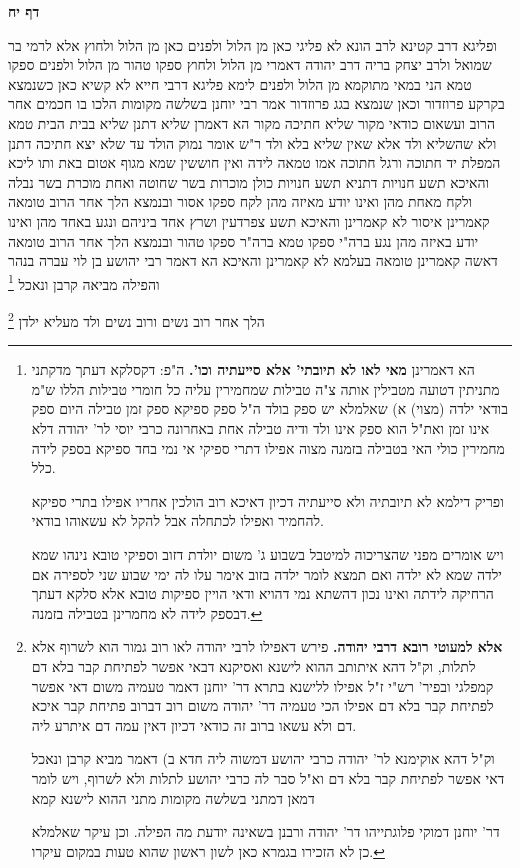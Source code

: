 \documentclass[12pt, openany]{book}
\newcommand{\sethebfont}{
\fontsize{10.5pt}{21.0pt} \selectfont
}
\newcommand{\twocol}[1]{
	{\sethebfont \begin{multicols}{2}
			#1
	\end{multicols}}	
}
\newcommand{\sectname}{}
\newcommand{\newsection}[1]{
	\addcontentsline{toc}{section}{#1}
	\renewcommand{\sectname}{#1}	
	\vspace{-\baselineskip}
	\begin{center}
		\textbf{%
\fontsize{16pt}{16pt}\selectfont
			#1}
	\end{center}
	\vspace{-\baselineskip}
	\nopagebreak
}
\newcommand{\footnotecomment}[1]{\footnote{#1}}
\newcommand{\commenta}[1]{\footnotecomment{#1}}
\begin{document}
\newsection{דף יח}
\twocol{ופליגא דרב קטינא 
לרב הונא לא פליגי כאן מן הלול ולפנים כאן מן הלול ולחוץ 
אלא לרמי בר שמואל ולרב יצחק בריה דרב יהודה דאמרי מן הלול ולחוץ ספקו טהור מן הלול ולפנים ספקו טמא הני במאי מתוקמא מן הלול ולפנים
לימא פליגא דרבי חייא 
לא קשיא כאן כשנמצא בקרקע פרוזדור וכאן שנמצא בגג פרוזדור 
אמר רבי יוחנן  בשלשה מקומות הלכו בו חכמים אחר הרוב ועשאום כודאי  מקור שליא חתיכה  מקור הא דאמרן
שליא דתנן  שליא בבית הבית טמא ולא שהשליא ולד אלא שאין שליא בלא ולד  ר"ש אומר  נמוק הולד עד שלא יצא 
חתיכה דתנן  המפלת יד חתוכה ורגל חתוכה אמו טמאה לידה ואין חוששין שמא מגוף אטום באת 
ותו ליכא  והאיכא תשע חנויות 
דתניא  תשע חנויות כולן מוכרות בשר שחוטה ואחת מוכרת בשר נבלה ולקח מאחת מהן ואינו יודע מאיזה מהן לקח ספקו אסור
ובנמצא הלך אחר הרוב 
טומאה קאמרינן איסור לא קאמרינן 
והאיכא תשע צפרדעין ושרץ אחד ביניהם ונגע באחד מהן ואינו יודע באיזה מהן נגע ברה"י ספקו טמא ברה"ר ספקו טהור
ובנמצא הלך אחר הרוב 
טומאה דאשה קאמרינן טומאה בעלמא לא קאמרינן 
והאיכא הא דאמר רבי יהושע בן לוי  עברה בנהר
והפילה מביאה קרבן ונאכל
\commenta{הא דאמרינן \textbf{מאי לאו לא תיובתי' אלא סייעתיה וכו'.}  ה"פ: דקסלקא דעתך מדקתני מתניתין דטועה מטבילין אותה צ"ה טבילות שמחמירין עליה כל חומרי טבילות הללו ש"מ בודאי ילדה (מצוי) א) שאלמלא יש ספק בולד ה"ל ספק ספיקא ספק זמן טבילה היום ספק אינו זמן ואת"ל הוא ספק אינו ולד ודיה טבילה אחת באחרונה כרבי יוסי לר' יהודה דלא מחמירין כולי האי בטבילה בזמנה מצוה אפילו דתרי ספיקי אי נמי בחד ספיקא בספק לידה כלל.\par ופריק דילמא לא תיובתיה ולא סייעתיה דכיון דאיכא רוב הולכין אחריו אפילו בתרי ספיקא להחמיר ואפילו לכתחלה אבל להקל לא עשאוהו בודאי.\par ויש אומרים מפני שהצריכוה למיטבל בשבוע ג' משום יולדת דזוב וספיקי טובא נינהו שמא ילדה שמא לא ילדה ואם תמצא לומר ילדה בזוב אימר עלו לה ימי שבוע שני לספירה אם הרחיקה לידתה ואינו נכון דהשתא נמי דהויא ודאי הויין ספיקות טובא אלא סלקא דעתך דבספק לידה לא מחמרינן בטבילה בזמנה. }

הלך אחר רוב נשים ורוב נשים ולד מעליא ילדן 
\commenta{\textbf{אלא למעוטי רובא דרבי יהודה.}  פירש דאפילו לרבי יהודה לאו רוב גמור הוא לשרוף אלא לתלות, וק"ל דהא איתותב ההוא לישנא ואסיקנא דבאי אפשר לפתיחת קבר בלא דם קמפלגי ובפיר' רש"י ז"ל אפילו ללישנא בתרא דר' יוחנן דאמר טעמיה משום דאי אפשר לפתיחת קבר בלא דם אפילו הכי טעמיה דר' יהודה משום רוב דברוב פתיחת קבר איכא דם ולא עשאו ברוב זה כודאי דכיון דאין עמה דם איתרע ליה.\par  וק"ל דהא אוקימנא לר' יהודה כרבי יהושע דמשוה ליה חדא ב) דאמר מביא קרבן ונאכל דאי אפשר לפתיחת קבר בלא דם וא"ל סבר לה כרבי יהושע לתלות ולא לשרוף, ויש לומר דמאן דמתני בשלשה מקומות מתני ההוא לישנא קמא\par  דר' יוחנן דמוקי פלוגתייהו דר' יהודה ורבנן בשאינה יודעת מה הפילה. וכן עיקר שאלמלא כן לא הזכירו בגמרא כאן לשון ראשון שהוא טעות במקום עיקרו. }

}
\end{document}
